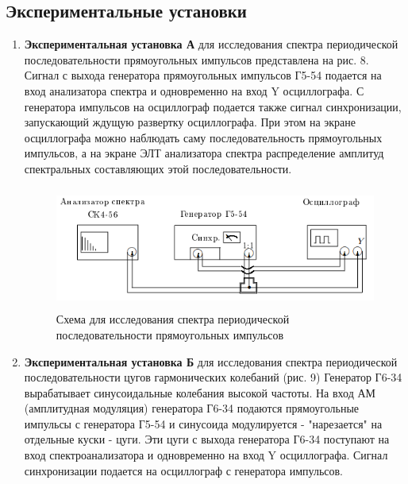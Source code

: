 \documentclass[12pt,a4paper]{article}
\begin{document}
	\subsection{Экспериментальные установки}
	
	\begin{enumerate}
		
		\item \textbf{Экспериментальная установка А} для исследования спектра периодической последовательности прямоугольных импульсов представлена на рис. 8. Сигнал с выхода генератора прямоугольных импульсов Г5-54 подается на вход анализатора спектра и одновременно  на вход Y осциллографа. С генератора импульсов на осциллограф подается также сигнал синхронизации, запускающий ждущую развертку осциллографа. При этом на экране осциллографа можно наблюдать саму последовательность прямоугольных импульсов, а на экране ЭЛТ анализатора спектра  распределение амплитуд спектральных составляющих этой последовательности.
		
\begin{figure}[H]
	\begin{center}
		\includegraphics[width=15cm, height=4cm]{3.6.1-8}
		\caption{Схема для исследования спектра периодической последовательности прямоугольных импульсов}
	\end{center}
\end{figure}		
		
		\item \textbf{Экспериментальная установка Б} для исследования спектра периодической последовательности цугов гармонических колебаний (рис. 9) Генератор Г6-34 вырабатывает синусоидальные колебания высокой частоты. На вход АМ (амплитудная модуляция) генератора Г6-34 подаются прямоугольные импульсы с генератора Г5-54 и синусоида модулируется - "нарезается" на отдельные куски - цуги. Эти цуги с выхода генератора Г6-34 поступают на вход спектроанализатора и одновременно на вход Y осциллографа. Сигнал синхронизации подается на осциллограф с генератора импульсов.
		

\end{enumerate}
\end{document}
